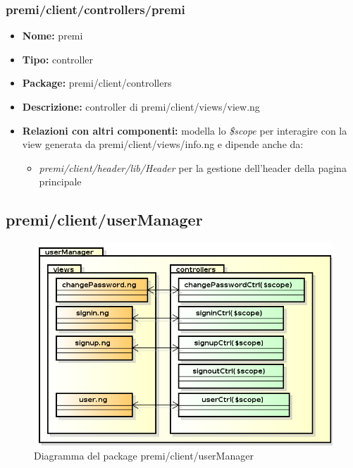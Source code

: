 \subsubsection{premi/client/controllers/premi}
\begin{itemize}
  \item[] \textbf{Nome:} premi
  \item[] \textbf{Tipo:} controller
  \item[] \textbf{Package:} premi/client/controllers
  \item[] \textbf{Descrizione:} controller di premi/client/views/view.ng
  \item[] \textbf{Relazioni con altri componenti:} modella lo \textit{\$scope} per interagire con la view generata da premi/client/views/info.ng e dipende anche da:
 \begin{itemize}
 \item \textit{premi/client/header/lib/Header} per la gestione dell'header della pagina principale
 \end{itemize}
\end{itemize}

\subsection{premi/client/userManager}
\begin{figure}[h]
\begin{center}
\includegraphics[scale=0.45]{img/diapkg/userManager.png}
\caption{Diagramma del package premi/client/userManager}
\end{center}
\end{figure}


